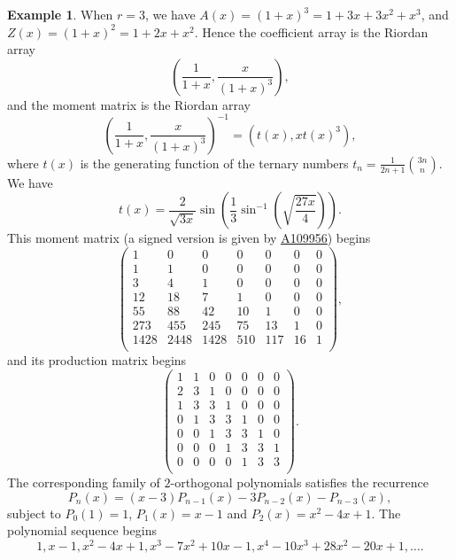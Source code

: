 \documentclass[12pt,reqno]{article}
\theoremstyle{definition}
\newtheorem{example}[theorem]{Example}
\newcommand{\seqnum}[1]{\href{http://oeis.org/#1}{\underline{#1}}}
\begin{document}
\begin{example} When $r=3$, we have $A(x)=(1+x)^3=1+3x+3x^2+x^3$, and $Z(x)=(1+x)^2=1+2x+x^2$. Hence the coefficient array is the Riordan array
$$\left(\frac{1}{1+x}, \frac{x}{(1+x)^3}\right),$$ and the moment matrix is the Riordan array
$$\left(\frac{1}{1+x}, \frac{x}{(1+x)^3}\right)^{-1}=(t(x), x t(x)^3),$$ where $t(x)$ is the generating function of the ternary numbers
$t_n=\frac{1}{2n+1}\binom{3n}{n}$. We have
$$t(x)=\frac{2}{\sqrt{3x}}\sin\left(\frac{1}{3}\sin^{-1}\left(\sqrt{\frac{27x}{4}}\right)\right).$$
This moment matrix (a signed version is given by \seqnum{A109956}) begins
$$\left(
\begin{array}{ccccccc}
1& 0 & 0 & 0 & 0 & 0 & 0 \\
1 & 1 & 0 & 0 & 0 & 0 & 0 \\
3 & 4 & 1 & 0 & 0 & 0 & 0 \\
12 & 18 & 7 & 1 & 0 & 0 & 0 \\
55 & 88 & 42 & 10 & 1 & 0 & 0 \\
273 & 455 & 245 & 75 & 13 & 1 & 0 \\
1428 & 2448 & 1428 & 510 & 117 & 16 & 1 \\
\end{array}\right),$$ and its production matrix begins
$$\left(
\begin{array}{ccccccc}
1 &1 & 0 & 0 & 0 & 0 & 0 \\
2 & 3 & 1 & 0 & 0 & 0 & 0 \\
1 & 3 & 3 & 1 & 0 & 0 & 0 \\
0 & 1 & 3 & 3 & 1 & 0 & 0 \\
0 & 0 & 1 & 3 & 3 & 1 & 0 \\
0 & 0 & 0 & 1 & 3 & 3 & 1 \\
0 & 0 & 0 & 0 & 1 & 3 & 3 \\
\end{array}\right).$$
The corresponding family of $2$-orthogonal polynomials satisfies the recurrence
$$P_n(x)=(x-3)P_{n-1}(x)-3P_{n-2}(x)-P_{n-3}(x),$$ subject to $P_0(1)=1$, $P_1(x)=x-1$ and $P_2(x)=x^2-4x+1$.  The polynomial sequence begins
$$1, x - 1, x^2 - 4x + 1, x^3 - 7x^2 + 10x - 1, x^4 - 10x^3 + 28x^2 - 20x + 1,\ldots.$$
\end{example}
\end{document}
